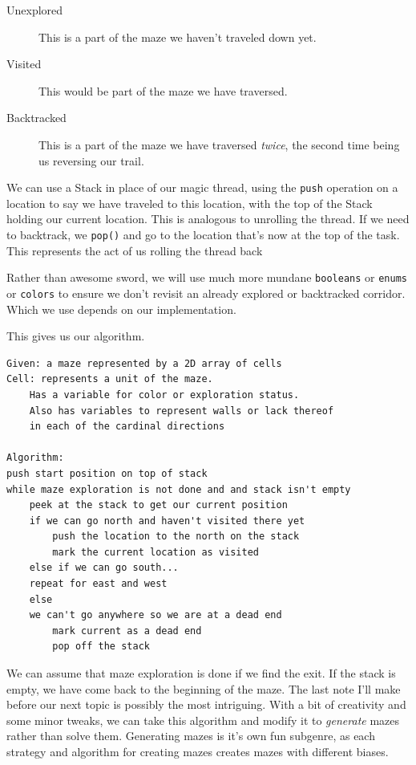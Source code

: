 \begin{description}
	\item[Unexplored] This is a part of the maze we haven't traveled down yet.
	\item[Visited] This would be part of the maze we have traversed.
	\item[Backtracked] This is a part of the maze we have traversed \textit{twice}, the second time being us reversing our trail.
\end{description}

We can use a Stack in place of our magic thread, using the \texttt{push} operation on a location to say we have traveled to this location, with the top of the Stack holding our current location.  This is analogous to unrolling the thread. If we need to backtrack, we \texttt{pop()} and go to the location that's now at the top of the task.  This represents the act of us rolling the thread back

Rather than awesome sword, we will use much more mundane \texttt{booleans} or \texttt{enums} or \texttt{colors} to ensure we don't revisit an already explored or backtracked corridor.  Which we use depends on our implementation.


This gives us our algorithm.

\begin{verbatim}
Given: a maze represented by a 2D array of cells
Cell: represents a unit of the maze. 
    Has a variable for color or exploration status.
    Also has variables to represent walls or lack thereof
    in each of the cardinal directions

Algorithm:
push start position on top of stack
while maze exploration is not done and and stack isn't empty
    peek at the stack to get our current position
    if we can go north and haven't visited there yet
        push the location to the north on the stack
        mark the current location as visited
    else if we can go south...
    repeat for east and west
    else
    we can't go anywhere so we are at a dead end
        mark current as a dead end
        pop off the stack
\end{verbatim}


We can assume that maze exploration is done if we find the exit.  If the stack is empty, we have come back to the beginning of the maze.  
The last note I'll make before our next topic is possibly the most intriguing.  With a bit of creativity and some minor tweaks, we can take this algorithm and modify it to \textit{generate} mazes rather than solve them. Generating mazes is it's own fun subgenre, as each strategy and algorithm for creating mazes creates mazes with different biases. 


